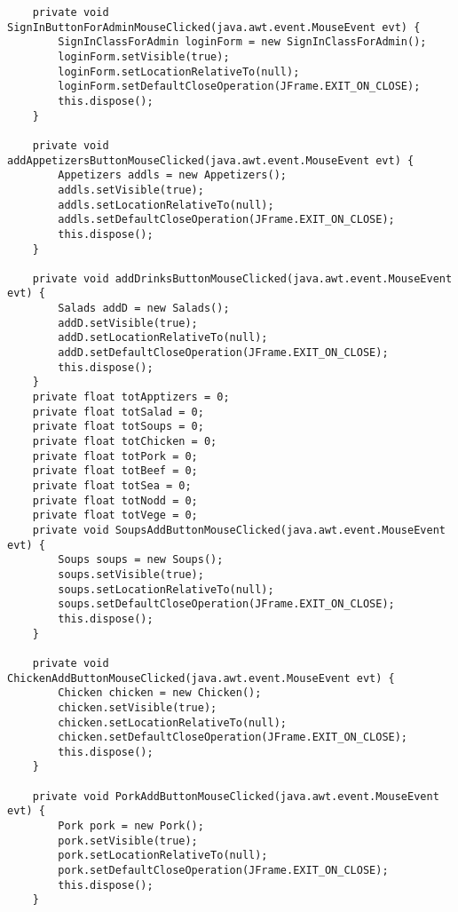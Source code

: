 \documentclass[12pt,a4paper]{article}
\begin{document}
\begin{lstlisting}
    private void SignInButtonForAdminMouseClicked(java.awt.event.MouseEvent evt) {                                                  
        SignInClassForAdmin loginForm = new SignInClassForAdmin();
        loginForm.setVisible(true);
        loginForm.setLocationRelativeTo(null);
        loginForm.setDefaultCloseOperation(JFrame.EXIT_ON_CLOSE);
        this.dispose();
    }                                                 

    private void addAppetizersButtonMouseClicked(java.awt.event.MouseEvent evt) {                                                 
        Appetizers addls = new Appetizers();
        addls.setVisible(true);
        addls.setLocationRelativeTo(null);
        addls.setDefaultCloseOperation(JFrame.EXIT_ON_CLOSE);
        this.dispose();
    }                                                

    private void addDrinksButtonMouseClicked(java.awt.event.MouseEvent evt) {                                             
        Salads addD = new Salads();
        addD.setVisible(true);
        addD.setLocationRelativeTo(null);
        addD.setDefaultCloseOperation(JFrame.EXIT_ON_CLOSE);
        this.dispose();
    }                                            
    private float totApptizers = 0;
    private float totSalad = 0;
    private float totSoups = 0;
    private float totChicken = 0;
    private float totPork = 0;
    private float totBeef = 0;
    private float totSea = 0;
    private float totNodd = 0;
    private float totVege = 0;
    private void SoupsAddButtonMouseClicked(java.awt.event.MouseEvent evt) {                                            
        Soups soups = new Soups();
        soups.setVisible(true);
        soups.setLocationRelativeTo(null);
        soups.setDefaultCloseOperation(JFrame.EXIT_ON_CLOSE);
        this.dispose();
    }                                           

    private void ChickenAddButtonMouseClicked(java.awt.event.MouseEvent evt) {                                              
        Chicken chicken = new Chicken();
        chicken.setVisible(true);
        chicken.setLocationRelativeTo(null);
        chicken.setDefaultCloseOperation(JFrame.EXIT_ON_CLOSE);
        this.dispose();
    }                                             

    private void PorkAddButtonMouseClicked(java.awt.event.MouseEvent evt) {                                           
        Pork pork = new Pork();
        pork.setVisible(true);
        pork.setLocationRelativeTo(null);
        pork.setDefaultCloseOperation(JFrame.EXIT_ON_CLOSE);
        this.dispose();
    }                                          


\end{lstlisting}
\end{document}
